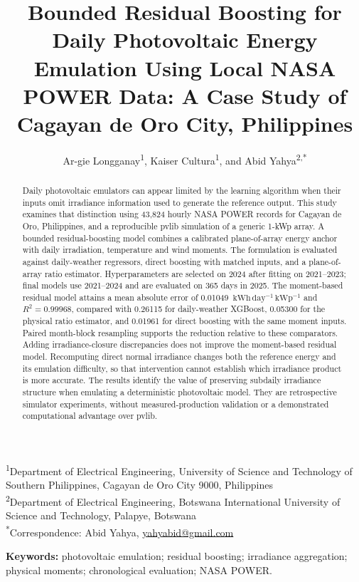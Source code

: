 \documentclass[11pt,a4paper]{article}
\title{Bounded Residual Boosting for Daily Photovoltaic Energy Emulation Using Local NASA POWER Data: A Case Study of Cagayan de Oro City, Philippines}
\author{Ar-gie Longganay\textsuperscript{1}, Kaiser Cultura\textsuperscript{1}, and Abid Yahya\textsuperscript{2,*}}
\date{}
\newcommand{\unit}{\ensuremath{\mathrm{kWh\,day^{-1}\,kWp^{-1}}}}
\begin{document}
\maketitle
\vspace{-1.3em}
\begin{center}\small
\textsuperscript{1}Department of Electrical Engineering, University of Science and Technology of Southern Philippines, Cagayan de Oro City 9000, Philippines\\
\textsuperscript{2}Department of Electrical Engineering, Botswana International University of Science and Technology, Palapye, Botswana\\
\textsuperscript{*}Correspondence: Abid Yahya, \href{mailto:yahyabid@gmail.com}{yahyabid@gmail.com}
\end{center}
\begin{abstract}
Daily photovoltaic emulators can appear limited by the learning algorithm when their inputs omit irradiance information used to generate the reference output. This study examines that distinction using 43,824 hourly NASA POWER records for Cagayan de Oro, Philippines, and a reproducible pvlib simulation of a generic 1-kWp array. A bounded residual-boosting model combines a calibrated plane-of-array energy anchor with daily irradiation, temperature and wind moments. The formulation is evaluated against daily-weather regressors, direct boosting with matched inputs, and a plane-of-array ratio estimator. Hyperparameters are selected on 2024 after fitting on 2021--2023; final models use 2021--2024 and are evaluated on 365 days in 2025. The moment-based residual model attains a mean absolute error of 0.01049~\unit{} and $R^2=0.99968$, compared with 0.26115 for daily-weather XGBoost, 0.05300 for the physical ratio estimator, and 0.01961 for direct boosting with the same moment inputs. Paired month-block resampling supports the reduction relative to these comparators. Adding irradiance-closure discrepancies does not improve the moment-based residual model. Recomputing direct normal irradiance changes both the reference energy and its emulation difficulty, so that intervention cannot establish which irradiance product is more accurate. The results identify the value of preserving subdaily irradiance structure when emulating a deterministic photovoltaic model. They are retrospective simulator experiments, without measured-production validation or a demonstrated computational advantage over pvlib.
\end{abstract}
\noindent\textbf{Keywords:} photovoltaic emulation; residual boosting; irradiance aggregation; physical moments; chronological evaluation; NASA POWER.
\end{document}

